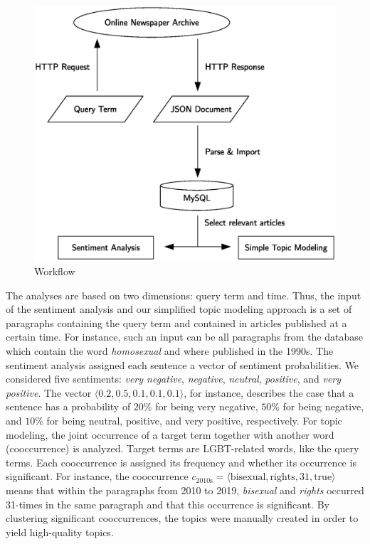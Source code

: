 \documentclass[10pt,a4paper,twocolumn]{scrartcl}
\begin{document}
\begin{figure}
\includegraphics[width=\columnwidth]{figures/workflow_eps}
\caption{Workflow} \label{fig:workflow}
\end{figure}

The analyses are based on two dimensions: query term and time. Thus, the input of the sentiment analysis and our simplified topic modeling approach is a set of paragraphs containing the query term and contained in articles published at a certain time. For instance, such an input can be all paragraphs from the database which contain the word \textit{homosexual} and where published in the 1990s. The sentiment analysis assigned each sentence a vector of sentiment probabilities. We considered five sentiments: \textit{very negative}, \textit{negative}, \textit{neutral}, \textit{positive}, and \textit{very positive}. The vector $\langle 0.2, 0.5, 0.1, 0.1, 0.1\rangle$, for instance, describes the case that a sentence has a probability of $20\%$ for being very negative, $50\%$ for being negative, and $10\%$ for being neutral, positive, and very positive, respectively. For topic modeling, the joint occurrence of a target term together with another word (cooccurrence) is analyzed. Target terms are LGBT-related words, like the query terms. Each cooccurrence is assigned its frequency and whether its occurrence is significant. For instance, the cooccurrence $c_\text{2010s} = \langle \text{bisexual}, \text{rights}, 31, \text{true}\rangle$ means that within the paragraphs from 2010 to 2019, \textit{bisexual} and \textit{rights} occurred 31-times in the same paragraph and that this occurrence is significant. By clustering significant cooccurrences, the topics were manually created in order to yield high-quality topics.
\end{document}
